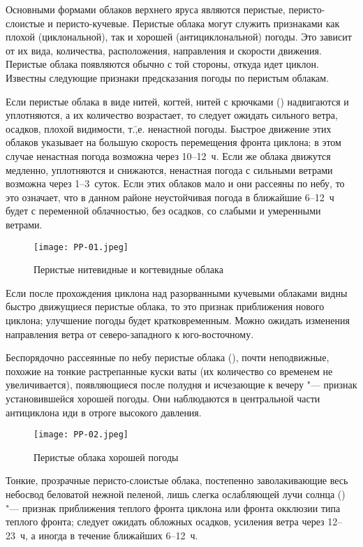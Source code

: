 Основными формами облаков верхнего яруса являются перистые,
перисто-слоистые и перисто-кучевые. Перистые облака могут служить
признаками как плохой (циклональной), так и хорошей (антициклональной)
погоды. Это зависит от их вида, количества, расположения, направления
и скорости движения. Перистые облака появляются обычно с той стороны,
откуда идет циклон. Известны следующие признаки предсказания погоды по
перистым облакам.

 Если перистые облака в виде нитей, когтей, нитей с крючками
() надвигаются и уплотняются, а их количество возрастает,
то следует ожидать сильного ветра, осадков, плохой видимости,
т.\=,е. ненастной погоды. Быстрое движение этих облаков указывает на
большую скорость перемещения фронта циклона; в этом случае ненастная
погода возможна через 10--12~ч. Если же облака движутся медленно,
уплотняются и снижаются, ненастная погода с сильными ветрами возможна
через 1--3~суток. Если этих облаков мало и они рассеяны по небу,
то это означает, что в данном районе неустойчивая погода в ближайшие
6--12~ч будет с переменной облачностью, без осадков, со слабыми и
умеренными ветрами.

\begin{figure}[htb]
  \centering{}
  \texttt{[image: PP-01.jpeg]}
  \caption{Перистые нитевидные и когтевидные облака}
  \label{fig:pp01}
  \small
  \centering{}
\end{figure}

 Если после прохождения циклона над разорванными кучевыми
облаками видны быстро движущиеся перистые облака, то это признак
приближения нового циклона; улучшение погоды будет
кратковременным. Можно ожидать изменения направления ветра от
северо-западного к юго-восточному.

 Беспорядочно рассеянные по небу перистые облака (),
почти неподвижные, похожие на тонкие растрепанные куски ваты (их
количество со временем не увеличивается), появляющиеся после полудня и
исчезающие к вечеру "--- признак установившейся хорошей погоды. Они
наблюдаются в центральной части антициклона иди в отроге высокого
давления.

\begin{figure}[htb]
  \centering{}
  \texttt{[image: PP-02.jpeg]}
  \caption{Перистые облака хорошей погоды}
  \label{fig:pp02}
  \small
  \centering{}
\end{figure}

 Тонкие, прозрачные перисто-слоистые облака, постепенно
заволакивающие весь небосвод беловатой нежной пеленой, лишь слегка
ослабляющей лучи солнца () "--- признак приближения теплого
фронта циклона или фронта окклюзии
типа теплого фронта; следует ожидать обложных
осадков, усиления ветра через 12--23~ч, а иногда в течение ближайших
6--12~ч.

